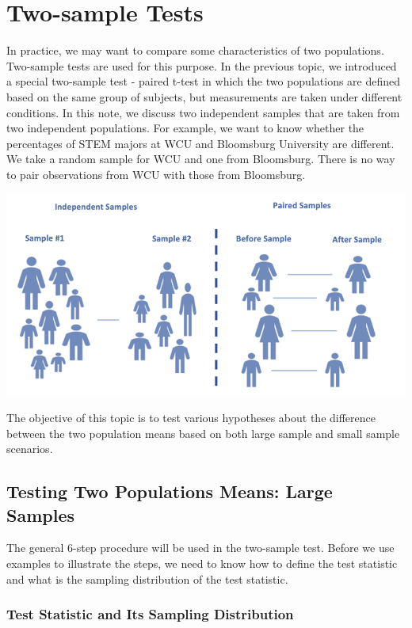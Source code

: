 \documentclass[
]{book}
\begin{document}
\hypertarget{two-sample-tests}{%
\chapter{Two-sample Tests}\label{two-sample-tests}}

In practice, we may want to compare some characteristics of two populations. Two-sample tests are used for this purpose. In the previous topic, we introduced a special two-sample test - paired t-test in which the two populations are defined based on the same group of subjects, but measurements are taken under different conditions. In this note, we discuss two independent samples that are taken from two independent populations. For example, we want to know whether the percentages of STEM majors at WCU and Bloomsburg University
are different. We take a random sample for WCU and one from Bloomsburg. There is no way to pair observations from WCU with those from Bloomsburg.

\begin{center}\includegraphics[width=0.7\linewidth]{week11/indepPairedSamples} \end{center}

The objective of this topic is to test various hypotheses about the difference between the two population means based on both large sample and small sample scenarios.

\hfill\break

\hypertarget{testing-two-populations-means-large-samples}{%
\section{Testing Two Populations Means: Large Samples}\label{testing-two-populations-means-large-samples}}

The general 6-step procedure will be used in the two-sample test. Before we use examples to illustrate the steps, we need to know how to define the test statistic and what is the sampling distribution of the test statistic.

\hypertarget{test-statistic-and-its-sampling-distribution}{%
\subsection{Test Statistic and Its Sampling Distribution}\label{test-statistic-and-its-sampling-distribution}}
\end{document}
